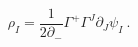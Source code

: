 \begin{equation}
\rho_I = \frac{1}{2 \partial_-}
        \Gamma^+ \Gamma^J \partial_J \psi_I ~.
\end{equation}

